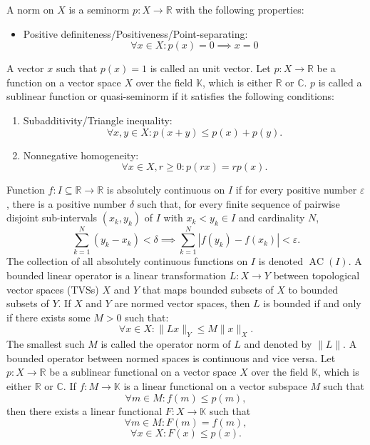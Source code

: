 \documentclass[a4paper,12pt]{article}
\begin{document}
A norm on $X$ is a seminorm $p\colon X\to\mathbb{R}$ with the following properties:
\begin{itemize}
\item Positive definiteness/Positiveness/Point-separating: \[\forall x\in X\colon p(x)=0\implies x=0\]
\end{itemize}
A vector $x$ such that $p(x)=1$ is called an unit vector.
Let $p\colon X\to\mathbb{R}$ be a function on a vector space $X$ over the field $\mathbb{K}$, which is either $\mathbb{R}$ or $\mathbb{C}$. $p$ is called a sublinear function or quasi-seminorm if it satisfies the following conditions:
\begin{enumerate}
\item Subadditivity/Triangle inequality:\[\forall x,y\in X\colon p(x+y)\leq p(x)+p(y).\]
\item Nonnegative homogeneity: \[\forall x\in X,r\geq 0\colon p(rx)=rp(x).\]
\end{enumerate}
Function $f\colon I\subseteq\mathbb{R}\to\mathbb{R}$ is absolutely continuous on $I$ if for every positive number $\varepsilon$, there is a positive number $\delta$ such that, for every finite sequence of pairwise disjoint sub-intervals $(x_k,y_k)$ of $I$ with $x_k<y_k\in I$ and cardinality $N$,
\[\sum_{k=1}^N(y_k-x_k)<\delta\implies\sum_{k=1}^N|f(y_k)-f(x_k)|<\varepsilon.\]
The collection of all absolutely continuous functions on $I$ is denoted $\operatorname {AC} (I)$.
A bounded linear operator is a linear transformation $L\colon X\to Y$ between topological vector spaces (TVSs) $X$ and $Y$ that maps bounded subsets of $X$ to bounded subsets of $Y$. If $X$ and $Y$ are normed vector spaces, then $L$ is bounded if and only if there exists some $M>0$ such that:
\[\forall x\in X\colon \|Lx\|_Y\leq M\|x\|_X.\]
The smallest such $M$ is called the operator norm of $L$ and denoted by $\|L\|$. A bounded operator between normed spaces is continuous and vice versa.
Let $p\colon X\to\mathbb{R}$ be a sublinear functional on a vector space $X$ over the field $\mathbb{K}$, which is either $\mathbb{R}$ or $\mathbb{C}$. If $f\colon M\to\mathbb{K}$ is a linear functional on a vector subspace $M$ such that
\[\forall m\in M\colon f(m)\leq p(m),\]
then there exists a linear functional $F\colon X\to\mathbb{K}$ such that
\[\forall m\in M\colon F(m)=f(m),\]
\[\forall x\in X\colon F(x)\leq p(x).\]
\end{document}
